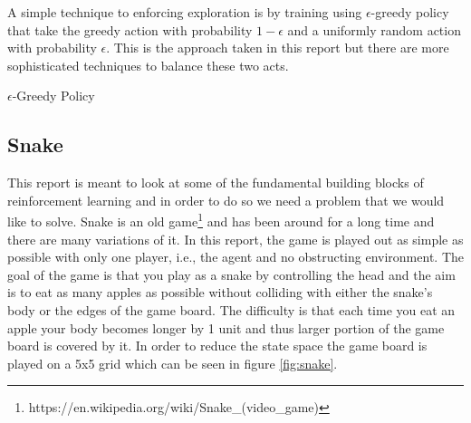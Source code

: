 \documentclass[result.tex]{subfiles}
\begin{document}
    A simple technique to enforcing exploration is by training using $\epsilon$-greedy policy that take the greedy action with probability $1 - \epsilon$ and a uniformly random action with probability $\epsilon$. This is the approach taken in this report but there are more sophisticated techniques to balance these two acts.

    \begin{algorithm}[H]
        \caption{$\epsilon$-Greedy Policy}
        \label{alg:epslion-greedy-policy}
        \begin{algorithmic}[1]
            \Statex
            \Else
            \EndIf
            \State
            \EndFunction
        \end{algorithmic}
    \end{algorithm}

    \subsection*{Snake}

    This report is meant to look at some of the fundamental building blocks of reinforcement learning and in order to do so we need a problem that we would like to solve. Snake is an old game\footnote{https://en.wikipedia.org/wiki/Snake\_(video\_game)} and has been around for a long time and there are many variations of it. In this report, the game is played out as simple as possible with only one player, i.e., the agent and no obstructing environment. The goal of the game is that you play as a snake by controlling the head and the aim is to eat as many apples as possible without colliding with either the snake's body or the edges of the game board. The difficulty is that each time you eat an apple your body becomes longer by 1 unit and thus larger portion of the game board is covered by it. In order to reduce the state space the game board is played on a 5x5 grid which can be seen in figure \ref{fig:snake}.
\end{document}
